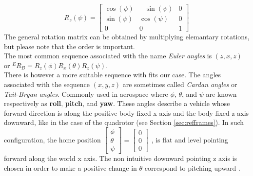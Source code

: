 \begin{equation}
R_z(\psi) = \begin{bmatrix} \cos(\psi)  & -\sin(\psi) &0 \\
							\sin(\psi) & \cos(\psi) &0\\
                              0         & 0          &1 
\end{bmatrix}
\end{equation}
The general rotation matrix can be obtained by multiplying elemantary rotations, but please note that the order is important.\\

\noindent
The most common sequence associated with the name \textit{Euler angles} is $(z, x, z)$ or ${}^ER_B = R_z(\phi)R_x(\theta)R_z(\psi)$.\\ 

\noindent
There is however a more suitable sequence with fits our case. The angles associated with the sequence $(x, y, z)$ are sometimes called \textit{Cardan angles} or \textit{Tait-Bryan angles}. Commonly used in aerospace where $\phi$, $\theta$, and $\psi$ are known respectively as\textbf{ roll}, \textbf{pitch}, and \textbf{yaw}. These angles describe a vehicle whose forward direction is along the positive body-fixed x-axis and the body-fixed z axis downward, like in the case of the quadrotor (see Section \ref{sec:refframes}). In such configuration, the home position $\begin{bmatrix}\phi\\ \theta \\ \psi \end{bmatrix} = \begin{bmatrix}0\\ 0 \\ 0 \end{bmatrix}$ , is flat and level pointing forward along the world x axis. The non intuitive downward pointing z axis is chosen in order to make a positive change in $\theta$ correspond to pitching upward \cite{Diebel2006}. \\

